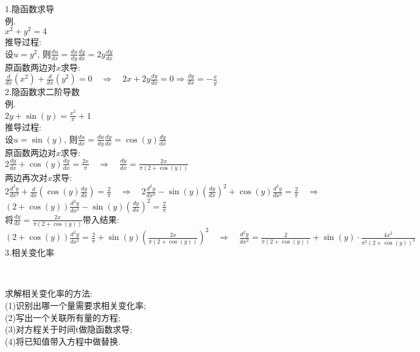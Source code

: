 \documentclass[UTF8, fontset=ubuntu, fleqn]{ctexart}
\begin{document}
1.隐函数求导\\
例.\\
$x^2+y^2=4$\\[2ex]
推导过程:\\
设$u=y^2$, 则$\frac{du}{dx}=\frac{du}{dy}\frac{dy}{dx}=2y\frac{dy}{dx}$\\
原函数两边对$x$求导:\\[1ex]
$\displaystyle\frac{d}{dx}(x^2)+\frac{d}{dx}(y^2)=0\quad\Rightarrow\quad 2x+2y\frac{dy}{dx}=0\Rightarrow\frac{dy}{dx}=-\frac{x}{y}$\\[2ex]

2.隐函数求二阶导数\\
例.\\
$2y+\sin(y)=\frac{x^2}{\pi}+1$\\[2ex]
推导过程:\\
设$u=\sin(y)$, 则$\frac{du}{dx}=\frac{du}{dy}\frac{dy}{dx}=\cos(y)\frac{dy}{dx}$\\
原函数两边对$x$求导:\\[1ex]
$\displaystyle 2\frac{dy}{dx}+\cos(y)\frac{dy}{dx}=\frac{2x}{\pi}\quad\Rightarrow\quad\frac{dy}{dx}=\frac{2x}{\pi(2+\cos(y))}$\\[1ex]
两边再次对$x$求导:\\[1ex]
$\displaystyle 2\frac{d^2y}{dx^2}+\frac{d}{dx}(\cos(y)\frac{dy}{dx})=\frac{2}{\pi}\quad\Rightarrow\quad 2\frac{d^2y}{dx^2}-\sin(y)(\frac{dy}{dx})^2+\cos(y)\frac{d^2y}{dx^2}=\frac{2}{\pi}\quad\Rightarrow$\\
$\displaystyle (2+\cos(y))\frac{d^2y}{dx^2}-\sin(y)(\frac{dy}{dx})^2=\frac{2}{\pi}$\\[1ex]
将$\frac{dy}{dx}=\frac{2x}{\pi(2+\cos(y))}$带入结果:\\[1ex]
$\displaystyle (2+\cos(y))\frac{d^2y}{dx^2}=\frac{2}{\pi}+\sin(y)(\frac{2x}{\pi(2+\cos(y))})^2\quad\Rightarrow\quad\frac{d^2y}{dx^2}=\frac{2}{\pi(2+\cos(y))}+\sin(y)\cdot\frac{4x^2}{\pi^2(2+\cos(y))^3}$\\[2ex]

3.相关变化率\\[-3ex]
\begin{center}
\\
\end{center}\vspace{-1ex}
\begin{center}
\end{center}
求解相关变化率的方法:\\
(1)识别出哪一个量需要求相关变化率;\\
(2)写出一个关联所有量的方程;\\
(3)对方程关于时间t做隐函数求导;\\
(4)将已知值带入方程中做替换.\\
\end{document}
